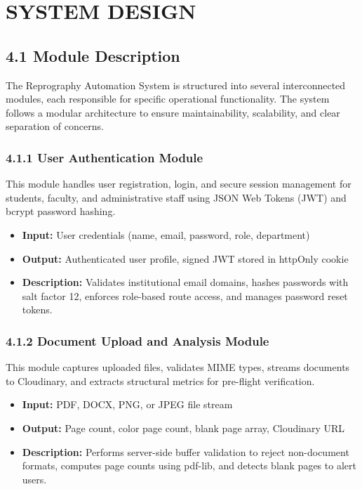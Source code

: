 \documentclass[12pt,a4paper]{report}
\begin{document}
\newpage
\chapter{SYSTEM DESIGN}

\section{4.1 Module Description}
The Reprography Automation System is structured into several interconnected modules, each responsible for specific operational functionality. The system follows a modular architecture to ensure maintainability, scalability, and clear separation of concerns.

\subsection{4.1.1 User Authentication Module}
This module handles user registration, login, and secure session management for students, faculty, and administrative staff using JSON Web Tokens (JWT) and bcrypt password hashing.
\begin{itemize}[leftmargin=0.35in, itemsep=1pt]
  \item \textbf{Input:} User credentials (name, email, password, role, department)
  \item \textbf{Output:} Authenticated user profile, signed JWT stored in httpOnly cookie
  \item \textbf{Description:} Validates institutional email domains, hashes passwords with salt factor 12, enforces role-based route access, and manages password reset tokens.
\end{itemize}

\subsection{4.1.2 Document Upload and Analysis Module}
This module captures uploaded files, validates MIME types, streams documents to Cloudinary, and extracts structural metrics for pre-flight verification.
\begin{itemize}[leftmargin=0.35in, itemsep=1pt]
  \item \textbf{Input:} PDF, DOCX, PNG, or JPEG file stream
  \item \textbf{Output:} Page count, color page count, blank page array, Cloudinary URL
  \item \textbf{Description:} Performs server-side buffer validation to reject non-document formats, computes page counts using pdf-lib, and detects blank pages to alert users.
\end{itemize}
\end{document}
